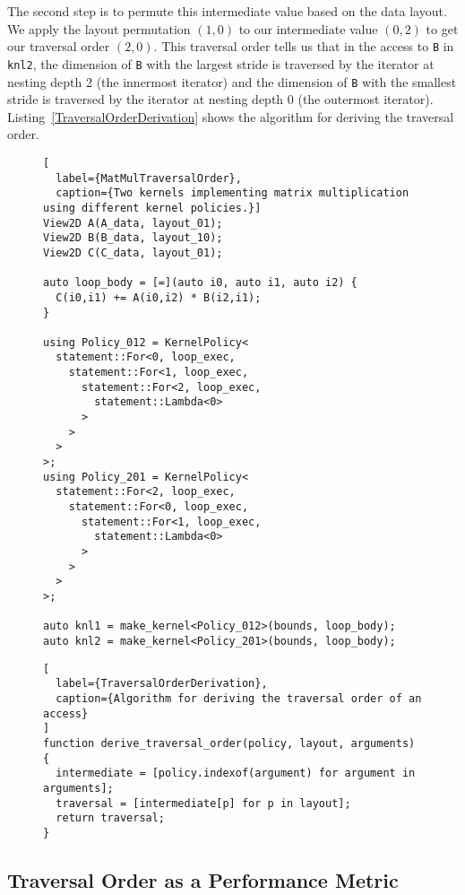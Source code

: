 \documentclass{article}
\begin{document}
The second step is to permute this intermediate value based on the data layout. 
We apply the layout permutation $(1,0)$ to our intermediate value $(0,2)$ to get our traversal order $(2,0)$. 
This traversal order tells us that in the access to \verb.B. in \verb.knl2., the dimension of \verb.B. with the largest stride is traversed by the iterator at nesting depth 2 (the innermost iterator) and the dimension of \verb.B. with the smallest stride is traversed by the iterator at nesting depth 0 (the outermost iterator). 
Listing~\ref{TraversalOrderDerivation} shows the algorithm for deriving the traversal order.

\begin{figure}
\begin{lstlisting}[
  label={MatMulTraversalOrder}, 
  caption={Two kernels implementing matrix multiplication using different kernel policies.}]
View2D A(A_data, layout_01);
View2D B(B_data, layout_10);
View2D C(C_data, layout_01);

auto loop_body = [=](auto i0, auto i1, auto i2) {
  C(i0,i1) += A(i0,i2) * B(i2,i1);
}

using Policy_012 = KernelPolicy<
  statement::For<0, loop_exec,
    statement::For<1, loop_exec,
      statement::For<2, loop_exec,
        statement::Lambda<0>
      >
    >
  >
>;
using Policy_201 = KernelPolicy<
  statement::For<2, loop_exec,
    statement::For<0, loop_exec,
      statement::For<1, loop_exec,
        statement::Lambda<0>
      >
    >
  >
>;

auto knl1 = make_kernel<Policy_012>(bounds, loop_body);
auto knl2 = make_kernel<Policy_201>(bounds, loop_body);
\end{lstlisting}

\end{figure}


\begin{figure}
\begin{lstlisting}[
  label={TraversalOrderDerivation}, 
  caption={Algorithm for deriving the traversal order of an access}
]
function derive_traversal_order(policy, layout, arguments) {
  intermediate = [policy.indexof(argument) for argument in arguments];
  traversal = [intermediate[p] for p in layout];
  return traversal;
}
\end{lstlisting}

\end{figure}

\subsection{Traversal Order as a Performance Metric}
\end{document}
